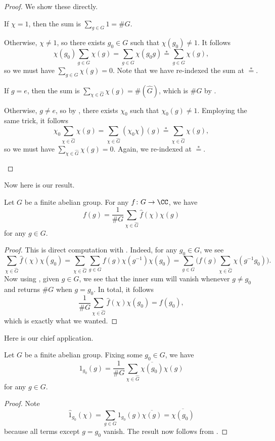 \documentclass[../notes.tex]{subfiles}
\begin{document}
\begin{proof}
	We show these directly.
	\begin{listalph}
		\item If $\chi=1$, then the sum is $\sum_{g\in G}1=\#G$.
		
		Otherwise, $\chi\ne1$, so there exists $g_0\in G$ such that $\chi(g_0)\ne1$. It follows
		\[\chi(g_0)\sum_{g\in G}\chi(g)=\sum_{g\in G}\chi(g_0g)\stackrel*=\sum_{g\in G}\chi(g),\]
		so we must have $\sum_{g\in G}\chi(g)=0$. Note that we have re-indexed the sum at $\stackrel*=$.
		\item If $g=e$, then the sum is $\sum_{\chi\in \widehat{G}}\chi(g)=\#(\widehat{G})$, which is $\#G$ by .

		Otherwise, $g\ne e$, so by , there exists $\chi_0$ such that $\chi_0(g)\ne1$. Employing the same trick, it follows
		\[\chi_0\sum_{\chi\in \widehat{G}}\chi(g)=\sum_{\chi\in \widehat{G}}(\chi_0\chi)(g)\stackrel*=\sum_{\chi\in \widehat{G}}\chi(g),\]
		so we must have $\sum_{\chi\in \widehat{G}}\chi(g)=0$. Again, we re-indexed at $\stackrel*=$.
		\qedhere
	\end{listalph}
\end{proof}
Now here is our result.
\begin{theorem} \label{thm:fourier-inversion}
	Let $G$ be a finite abelian group. For any $f\colon G\to\CC$, we have
	\[f(g)=\frac1{\#G}\sum_{\chi\in \widehat{G}}\widehat{f}(\chi)\chi(g)\]
	for any $g\in G$.
\end{theorem}
\begin{proof}
	This is direct computation with . Indeed, for any $g_0\in G$, we see
	\[\sum_{\chi\in \widehat{G}}\widehat{f}(\chi)\chi(g_0) = \sum_{\chi\in \widehat{G}}\sum_{g\in G}f(g)\chi\left(g^{-1}\right)\chi(g_0) = \sum_{g\in G}\Bigg(f(g)\sum_{\chi\in \widehat{G}}\chi\left(g^{-1}g_0\right)\Bigg).\]
	Now using , given $g\in G$, we see that the inner sum will vanish whenever $g\ne g_0$ and returns $\#G$ when $g=g_0$. In total, it follows
	\[\frac1{\#G}\sum_{\chi\in \widehat{G}}\widehat{f}(\chi)\chi(g_0)=f(g_0),\]
	which is exactly what we wanted.
\end{proof}
Here is our chief application.
\begin{corollary} \label{cor:indicate-g}
	Let $G$ be a finite abelian group. Fixing some $g_0\in G$, we have
	\[1_{g_0}(g)=\frac1{\#G}\sum_{\chi\in\widehat G}\overline{\chi(g_0)}\chi(g)\]
	for any $g\in G$.
\end{corollary}
\begin{proof}
	Note
	\[\widehat1_{g_0}(\chi)=\sum_{g\in G}1_{g_0}(g)\overline{\chi(g)}=\overline{\chi(g_0)}\]
	because all terms except $g=g_0$ vanish. The result now follows from .
\end{proof}
\end{document}
